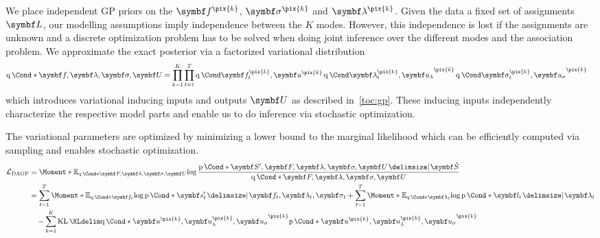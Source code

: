 We place independent GP priors on the $\mat{f}^{\pix{k}}$, $\mat{\sigma}^{\pix{k}}$ and $\mat{\lambda}^{\pix{k}}$.
Given the data a fixed set of assignments $\mat{L}$, our modelling assumptions imply independence between the $K$ modes.
However, this independence is lost if the assignments are unknown and a discrete optimization problem has to be solved when doing joint inference over the different modes and the association problem.
We approximate the exact posterior via a factorized variational distribution
\begin{align}
    \Variat*{\mat{f}, \mat{\lambda}, \mat{\sigma}, \mat{U}} & =
    \prod_{k=1}^K\prod_{t=1}^T \Variat{\mat{f}_t^{\pix{k}}, \mat{u}^{\pix{k}}} \Variat{\mat{\lambda}_t^{\pix{k}}, \mat{u}_\lambda}^{\pix{k}} \Variat{\mat{\sigma}_t^{\pix{k}}, \mat{u}_\sigma}^{\pix{k}}
\end{align}
which introduces variational inducing inputs and outputs $\mat{U}$ as described in~\cref{toc:gp}.
These inducing inputs independently characterize the respective model parts and enable us to do inference via stochastic optimization.

The variational parameters are optimized by minimizing a lower bound to the marginal likelihood which can be efficiently computed via sampling and enables stochastic optimization.
\begin{align}
    \begin{split}
        \label{eq:interpretable_rl:variational_bound}
        \Lc_{\text{DAGP}} &= \Moment*{\E_{\Variat*{\mat{F}, \mat{\lambda}, \mat{\sigma}, \mat{U}}}}{\log\frac{\Prob*{\mat{S}^\prime, \mat{F}, \mat{\lambda}, \mat{\sigma}, \mat{U} \given \mat{\hat{S}}}}{\Variat*{\mat{F}, \mat{\lambda}, \mat{\sigma}, \mat{U}}}} \\
        &=
        \sum_{t=1}^T \Moment*{\E_{\Variat*{\mat{f}_t}}}{\log \Prob*{\mat{s}^\prime_t \given \mat{f}_t, \mat{\lambda}_t, \mat{\sigma}_t}}
        + \sum_{t=1}^T \Moment*{\E_{\Variat*{\mat{\lambda}_t}}}{\log \Prob*{\mat{l}_t \given \mat{\lambda}_t}} \\
        &\quad
        - \sum_{k=1}^K \KL{\Variat*{\mat{u}^{\pix{k}}, \mat{u}_\lambda^{\pix{k}}, \mat{u}_\sigma}^{\pix{k}}}{\Prob*{\mat{u}^{\pix{k}}, \mat{u}_\lambda^{\pix{k}}, \mat{u}_\sigma}^{\pix{k}}}
    \end{split}
\end{align}

